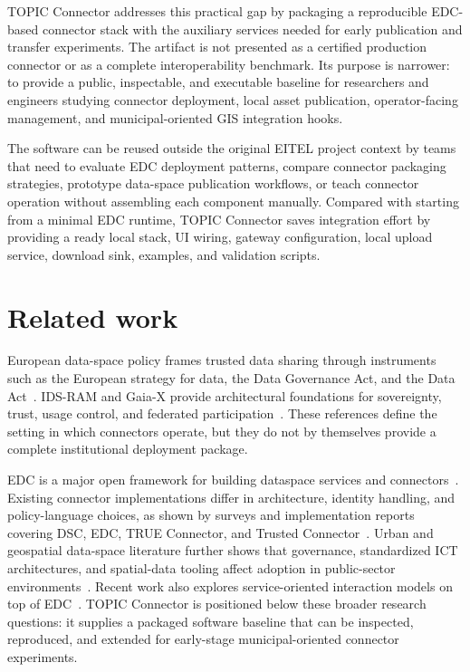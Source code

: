 \documentclass[preprint,12pt]{elsarticle}
\begin{document}
TOPIC Connector addresses this practical gap by packaging a reproducible EDC-based connector stack with the auxiliary services needed for early publication and transfer experiments. The artifact is not presented as a certified production connector or as a complete interoperability benchmark. Its purpose is narrower: to provide a public, inspectable, and executable baseline for researchers and engineers studying connector deployment, local asset publication, operator-facing management, and municipal-oriented GIS integration hooks.

The software can be reused outside the original EITEL project context by teams that need to evaluate EDC deployment patterns, compare connector packaging strategies, prototype data-space publication workflows, or teach connector operation without assembling each component manually. Compared with starting from a minimal EDC runtime, TOPIC Connector saves integration effort by providing a ready local stack, UI wiring, gateway configuration, local upload service, download sink, examples, and validation scripts.

\section{Related work}
European data-space policy frames trusted data sharing through instruments such as the European strategy for data, the Data Governance Act, and the Data Act~\cite{b1,b2,b3,b4}. IDS-RAM and Gaia-X provide architectural foundations for sovereignty, trust, usage control, and federated participation~\cite{b5,b6}. These references define the setting in which connectors operate, but they do not by themselves provide a complete institutional deployment package.

EDC is a major open framework for building dataspace services and connectors~\cite{b7}. Existing connector implementations differ in architecture, identity handling, and policy-language choices, as shown by surveys and implementation reports covering DSC, EDC, TRUE Connector, and Trusted Connector~\cite{b12,b13}. Urban and geospatial data-space literature further shows that governance, standardized ICT architectures, and spatial-data tooling affect adoption in public-sector environments~\cite{b14,b15,b16}. Recent work also explores service-oriented interaction models on top of EDC~\cite{b17}. TOPIC Connector is positioned below these broader research questions: it supplies a packaged software baseline that can be inspected, reproduced, and extended for early-stage municipal-oriented connector experiments.
\end{document}
